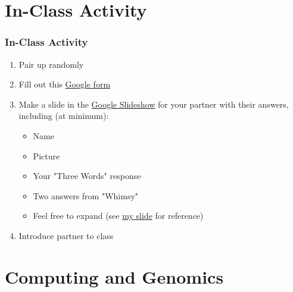 \documentclass[14pt]{beamer}
\begin{document}
\section{In-Class Activity}

\begin{frame}
\frametitle{In-Class Activity}
	\begin{enumerate}
	\item<1-> Pair up randomly
	\item<2-> Fill out this \href{https://goo.gl/forms/fnCaNIcwQiNiawcv1}{Google form}
	\item<3-> Make a slide in the \href{https://docs.google.com/presentation/d/1WxVQJGrBO8NxQ2ZJwvZy2W61qAQYqN9V8a_xRUflU7w/edit?usp=sharing}{Google Slideshow} for your partner with their answers, including (at minimum):
		\begin{itemize}
		\item<4-> Name
		\item<4-> Picture
		\item<4-> Your "Three Words" response
		\item<4-> Two answers from "Whimsy"
		\item<4-> Feel free to expand (see \href{https://docs.google.com/presentation/d/1WxVQJGrBO8NxQ2ZJwvZy2W61qAQYqN9V8a_xRUflU7w/edit?usp=sharing}{my slide} for reference)
		\end{itemize}
	\item<5-> Introduce partner to class
	\end{enumerate}
\end{frame}

\section{Computing and Genomics}
\end{document}
